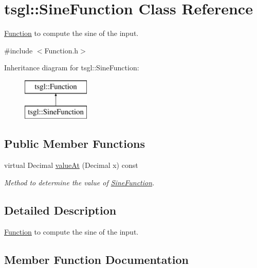 \hypertarget{classtsgl_1_1_sine_function}{}\section{tsgl\+:\+:Sine\+Function Class Reference}
\label{classtsgl_1_1_sine_function}


\hyperlink{classtsgl_1_1_function}{Function} to compute the sine of the input.  




{\ttfamily \#include $<$Function.\+h$>$}

Inheritance diagram for tsgl\+:\+:Sine\+Function\+:\begin{figure}[H]
\begin{center}
\leavevmode
\includegraphics[height=2.000000cm]{classtsgl_1_1_sine_function}
\end{center}
\end{figure}
\subsection*{Public Member Functions}
\begin{DoxyCompactItemize}
\item 
virtual Decimal \hyperlink{classtsgl_1_1_sine_function_a4a34d3310ea217255124d5e35805be3a}{value\+At} (Decimal x) const
\begin{DoxyCompactList}\small\item\em Method to determine the value of \hyperlink{classtsgl_1_1_sine_function}{Sine\+Function}. \end{DoxyCompactList}\end{DoxyCompactItemize}


\subsection{Detailed Description}
\hyperlink{classtsgl_1_1_function}{Function} to compute the sine of the input. 

\subsection{Member Function Documentation}
\mbox{\label{classtsgl_1_1_sine_function_a4a34d3310ea217255124d5e35805be3a}} 
